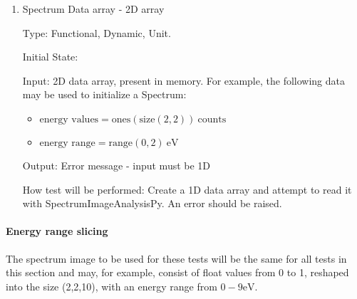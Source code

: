 \documentclass[12pt, titlepage]{article}
\newcommand{\progname}{SpectrumImageAnalysisPy}
\begin{document}
\begin{enumerate}
Initial State: 

Input: 1D data array, present in memory. For example, the following data may be used to initialize a Spectrum:
\begin{itemize}
	\item $\text{energy values} = \text{ones}(\text{size}(10)) + j*\text{ones}(\text{size}(10))\ \text{counts}$
	\item $\text{energy range} = \text{range}(0, 10)\ \si{\electronvolt}$
\end{itemize}

Output: Error message - input must be real

How test will be performed: Create a 1D data array and attempt to read it with \progname{}. An error should be raised.


\item{Spectrum Data array - 2D array}

Type: Functional, Dynamic, Unit.

Initial State: 

Input: 2D data array, present in memory. For example, the following data may be used to initialize a Spectrum:
\begin{itemize}
	\item $\text{energy values} = \text{ones}(\text{size}(2, 2))\ \text{counts}$
	\item $\text{energy range} = \text{range}(0, 2)\ \si{\electronvolt}$
\end{itemize}

Output: Error message - input must be 1D

How test will be performed: Create a 1D data array and attempt to read it with \progname{}. An error should be raised.

\end{enumerate}

\paragraph{Energy range slicing}

The spectrum image to be used for these tests will be the same for all tests in this section and may, for example, consist of float values from 0 to 1, reshaped into the size (2,2,10), with an energy range from $0-9 \si{\electronvolt}$.
\end{document}
